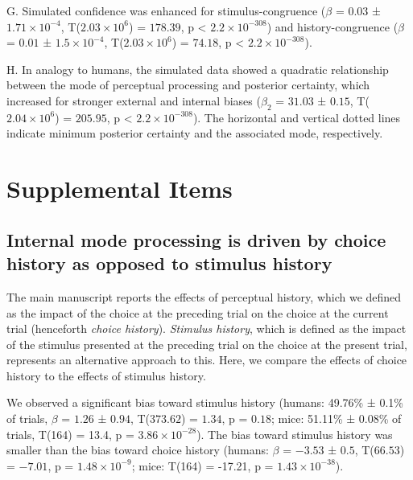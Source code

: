 \documentclass[
]{article}
\begin{document}
G. Simulated confidence was enhanced for stimulus-congruence (\(\beta\)
= \(0.03\) ± \(\ensuremath{1.71\times 10^{-4}}\),
T(\(\ensuremath{2.03\times 10^{6}}\)) = \(178.39\), p < \(\ensuremath{2.2\times 10^{-308}}\)) and
history-congruence (\(\beta\) = \(0.01\) ±
\(\ensuremath{1.5\times 10^{-4}}\),
T(\(\ensuremath{2.03\times 10^{6}}\)) = \(74.18\), p < \(\ensuremath{2.2\times 10^{-308}}\)).

H. In analogy to humans, the simulated data showed a quadratic
relationship between the mode of perceptual processing and posterior
certainty, which increased for stronger external and internal biases
(\(\beta_2\) = \(31.03\) ± \(0.15\),
T(\(\ensuremath{2.04\times 10^{6}}\)) = \(205.95\), p < \(\ensuremath{2.2\times 10^{-308}}\)). The
horizontal and vertical dotted lines indicate minimum posterior
certainty and the associated mode, respectively.

\hypertarget{supplemental-items}{%
\section{Supplemental Items}\label{supplemental-items}}

\hypertarget{internal-mode-processing-is-driven-by-choice-history-as-opposed-to-stimulus-history}{%
\subsection{Internal mode processing is driven by choice history as
opposed to stimulus
history}\label{internal-mode-processing-is-driven-by-choice-history-as-opposed-to-stimulus-history}}

The main manuscript reports the effects of perceptual history, which we
defined as the impact of the choice at the preceding trial on the choice
at the current trial (henceforth \emph{choice history}). \emph{Stimulus
history}, which is defined as the impact of the stimulus presented at
the preceding trial on the choice at the present trial, represents an
alternative approach to this. Here, we compare the effects of choice
history to the effects of stimulus history.

We observed a significant bias toward stimulus history (humans: 49.76\%
± 0.1\% of trials, \(\beta\) = \(1.26\) ± \(0.94\), T(\(373.62\)) =
\(1.34\), p = \(0.18\); mice: 51.11\% ± 0.08\% of trials, T(164) = 13.4,
p = \(\ensuremath{3.86\times 10^{-28}}\)). The bias toward stimulus
history was smaller than the bias toward choice history (humans:
\(\beta\) = \(-3.53\) ± \(0.5\), T(\(66.53\)) = \(-7.01\), p =
\(\ensuremath{1.48\times 10^{-9}}\); mice: T(164) = -17.21, p =
\(\ensuremath{1.43\times 10^{-38}}\)).
\end{document}
